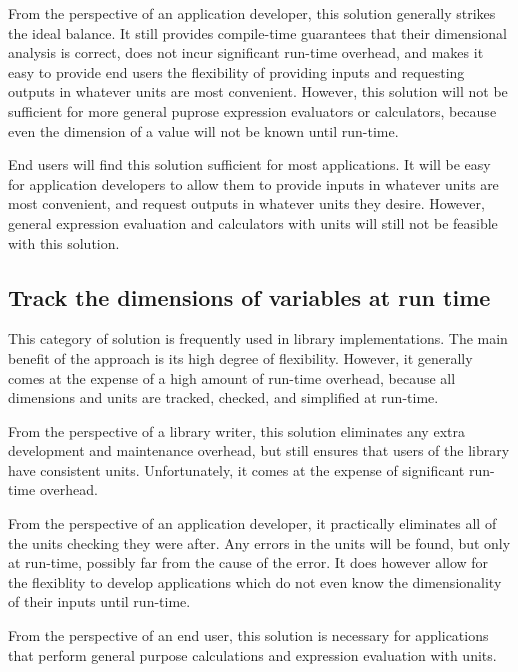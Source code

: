\documentclass{article}
\begin{document}
From the perspective of an application developer, this solution generally strikes the ideal balance.
It still provides compile-time guarantees that their dimensional analysis is correct,
does not incur significant run-time overhead,
and makes it easy to provide end users the flexibility of providing inputs and requesting outputs in whatever units are most convenient.
However, this solution will not be sufficient for more general puprose expression evaluators or calculators,
because even the dimension of a value will not be known until run-time.

End users will find this solution sufficient for most applications.
It will be easy for application developers to allow them to provide inputs in whatever units are most convenient,
and request outputs in whatever units they desire.
However, general expression evaluation and calculators with units will still not be feasible with this solution.

\subsection{Track the dimensions of variables at run time}
\label{dynamic-dimensions}

This category of solution is frequently used in library implementations.
The main benefit of the approach is its high degree of flexibility.
However, it generally comes at the expense of a high amount of run-time overhead,
because all dimensions and units are tracked, checked, and simplified at run-time.

From the perspective of a library writer, this solution eliminates any extra development and maintenance overhead,
but still ensures that users of the library have consistent units.
Unfortunately, it comes at the expense of significant run-time overhead.

From the perspective of an application developer, it practically eliminates all of the units checking they were after.
Any errors in the units will be found, but only at run-time, possibly far from the cause of the error.
It does however allow for the flexiblity to develop applications which do not even know the dimensionality of their inputs until run-time.

From the perspective of an end user, this solution is necessary for applications that perform general purpose calculations and expression evaluation with units.
\end{document}
